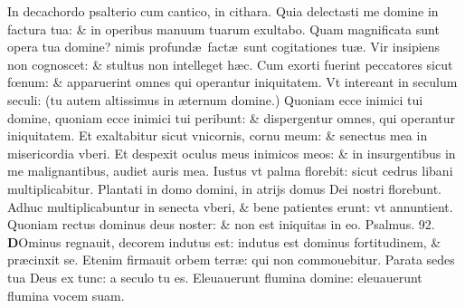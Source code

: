 \documentclass[a5paper,10pt]{book}
\def\ae{æ}
\def\oe{œ}
\begin{document}
\begin{multicols*}{2}
\newline \color{red} I\color{black}n decachordo psalterio cum cantico, in cithara.
\newline \color{red} Q\color{black}uia delectasti me domine in factura tua: \& in operibus manuum tuarum exultabo.
\newline \color{red} Q\color{black}uam magnificata sunt opera tua domine? nimis profund\ae \ fact\ae \ sunt cogitationes tu\ae .
\newline \color{red} V\color{black}ir insipiens non cognoscet: \& stultus non intelleget h\ae c.
\newline \color{red} C\color{black}um exorti fuerint peccatores sicut f\oe num: \& apparuerint omnes qui operantur iniquitatem.
\newline \color{red} V\color{black}t intereant in seculum seculi: (tu autem altissimus in \ae ternum domine.)
\newline \color{red} Q\color{black}uoniam ecce inimici tui domine, quoniam ecce inimici tui peribunt: \& dispergentur omnes, qui operantur iniquitatem.
\newline \color{red} E\color{black}t exaltabitur sicut vnicornis, cornu meum: \& senectus mea in misericordia vberi.
\newline \color{red} E\color{black}t despexit oculus meus inimicos meos: \& in insurgentibus in me malignantibus, audiet auris mea.
\newline \color{red} I\color{black}ustus vt palma florebit: sicut cedrus libani multiplicabitur.
\newline \color{red} P\color{black}lantati in domo domini, in atrijs domus Dei nostri florebunt.
\newline \color{red} A\color{black}dhuc multiplicabuntur in senecta vberi, \& bene patientes erunt: vt annuntient.
\newline \color{red} Q\color{black}uoniam rectus dominus deus noster: \& non est iniquitas in eo. \color{red} Psalmus. \hypertarget{ps92}{92.} \color{black}
\vspace{-1.25em}
\lettrine[lines=2]{\bfseries \color{red} D}{}Ominus regnauit, decorem indutus est: indutus est dominus fortitudinem, \& pr\ae cinxit se.
\newline \color{red} E\color{black}tenim firmauit orbem terr\ae : qui non commouebitur.
\newline \color{red} P\color{black}arata sedes tua Deus ex tunc: a seculo tu es.%
\newline \color{red} E\color{black}leuauerunt flumina domine: eleuauerunt flumina vocem suam.

\end{multicols*}
\end{document}
